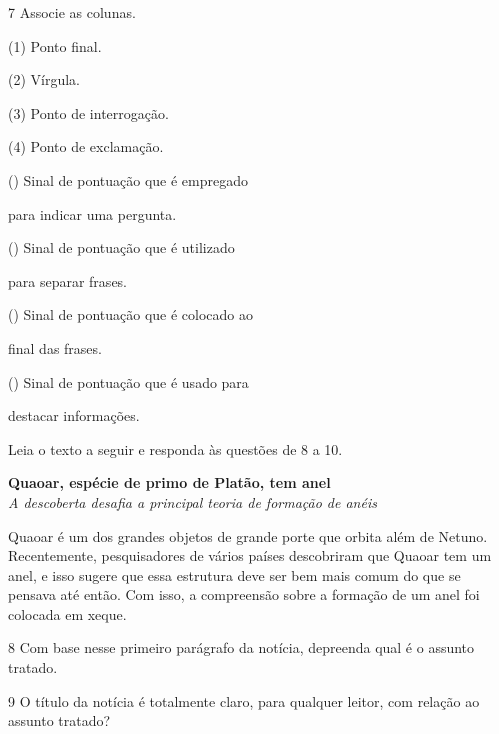 \num{7} Associe as colunas.

\begin{multicols}{2}
(1) Ponto final.\medskip

(2) Vírgula.\medskip

(3) Ponto de interrogação.\medskip

(4) Ponto de exclamação.

\columnbreak

({}) Sinal de pontuação que é empregado

para indicar uma pergunta.\medskip

({}) Sinal de pontuação que é utilizado

para separar frases.\medskip

({}) Sinal de pontuação que é colocado ao

final das frases.\medskip

({}) Sinal de pontuação que é usado para

destacar informações.
\end{multicols}

\bigskip
Leia o texto a seguir e responda às questões de 8 a 10.

\begin{myquote}
\textbf{Quaoar, espécie de primo de Platão, tem anel}\\
\textit{A descoberta desafia a principal teoria de formação de anéis}

Quaoar é um dos grandes objetos de grande porte que orbita além de Netuno.
Recentemente, pesquisadores de vários países descobriram que Quaoar tem um
anel, e isso sugere que essa estrutura deve ser bem mais comum do que se
pensava até então. Com isso, a compreensão sobre a formação de um anel
foi colocada em xeque.

\end{myquote}

\num{8} Com base nesse primeiro parágrafo da notícia, depreenda qual é o assunto tratado.



\num{9} O título da notícia é totalmente claro, para qualquer leitor, com relação ao assunto tratado?

